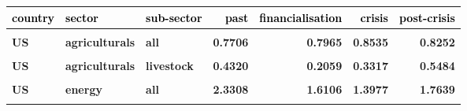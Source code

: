 \documentclass[
  authoryear,
  preprint,
  3p]{elsarticle}
\begin{document}
\begin{longtable}[t]{>{}l>{}l>{}l>{}r>{}r>{}r>{}r}
\toprule
\textcolor{black}{\textbf{country}} & \textcolor{black}{\textbf{sector}} & \textcolor{black}{\textbf{sub-sector}} & \textcolor{black}{\textbf{past}} & \textcolor{black}{\textbf{financialisation}} & \textcolor{black}{\textbf{crisis}} & \textcolor{black}{\textbf{post-crisis}}\\
\midrule
\textbf{\cellcolor{gray!10}{all}} & \textbf{\cellcolor{gray!10}{all}} & \textbf{\cellcolor{gray!10}{all}} & \textcolor[HTML]{4285f4}{\textbf{\cellcolor{gray!10}{0.8556}}} & \textcolor[HTML]{4285f4}{\textbf{\cellcolor{gray!10}{0.9709}}} & \textcolor[HTML]{4285f4}{\textbf{\cellcolor{gray!10}{1.0352}}} & \textcolor[HTML]{4285f4}{\textbf{\cellcolor{gray!10}{0.9438}}}\\
\textbf{US} & \textbf{agriculturals} & \textbf{all} & \textcolor[HTML]{4285f4}{\textbf{0.7706}} & \textcolor[HTML]{4285f4}{\textbf{0.7965}} & \textcolor[HTML]{4285f4}{\textbf{0.8535}} & \textcolor[HTML]{4285f4}{\textbf{0.8252}}\\
\textbf{\cellcolor{gray!10}{US}} & \textbf{\cellcolor{gray!10}{agriculturals}} & \textbf{\cellcolor{gray!10}{grains}} & \textcolor[HTML]{4285f4}{\textbf{\cellcolor{gray!10}{0.9891}}} & \textcolor[HTML]{4285f4}{\textbf{\cellcolor{gray!10}{1.1982}}} & \textcolor[HTML]{4285f4}{\textbf{\cellcolor{gray!10}{1.1727}}} & \textcolor[HTML]{4285f4}{\textbf{\cellcolor{gray!10}{1.0301}}}\\
\textbf{US} & \textbf{agriculturals} & \textbf{livestock} & \textcolor[HTML]{4285f4}{\textbf{0.4320}} & \textcolor[HTML]{4285f4}{\textbf{0.2059}} & \textcolor[HTML]{4285f4}{\textbf{0.3317}} & \textcolor[HTML]{4285f4}{\textbf{0.5484}}\\
\textbf{\cellcolor{gray!10}{US}} & \textbf{\cellcolor{gray!10}{agriculturals}} & \textbf{\cellcolor{gray!10}{softs}} & \textcolor[HTML]{4285f4}{\textbf{\cellcolor{gray!10}{0.7213}}} & \textcolor[HTML]{4285f4}{\textbf{\cellcolor{gray!10}{0.6900}}} & \textcolor[HTML]{4285f4}{\textbf{\cellcolor{gray!10}{0.7953}}} & \textcolor[HTML]{4285f4}{\textbf{\cellcolor{gray!10}{0.7589}}}\\
\addlinespace
\textbf{US} & \textbf{energy} & \textbf{all} & \textcolor[HTML]{4285f4}{\textbf{2.3308}} & \textcolor[HTML]{4285f4}{\textbf{1.6106}} & \textcolor[HTML]{4285f4}{\textbf{1.3977}} & \textcolor[HTML]{4285f4}{\textbf{1.7639}}\\
\textbf{\cellcolor{gray!10}{US}} & \textbf{\cellcolor{gray!10}{energy}} & \textbf{\cellcolor{gray!10}{gas}} & \textcolor[HTML]{4285f4}{\textbf{\cellcolor{gray!10}{2.6992}}} & \textcolor[HTML]{4285f4}{\textbf{\cellcolor{gray!10}{1.7090}}} & \textcolor[HTML]{4285f4}{\textbf{\cellcolor{gray!10}{1.0044}}} & \textcolor[HTML]{4285f4}{\textbf{\cellcolor{gray!10}{1.2585}}}\\

\end{longtable}
\end{document}

